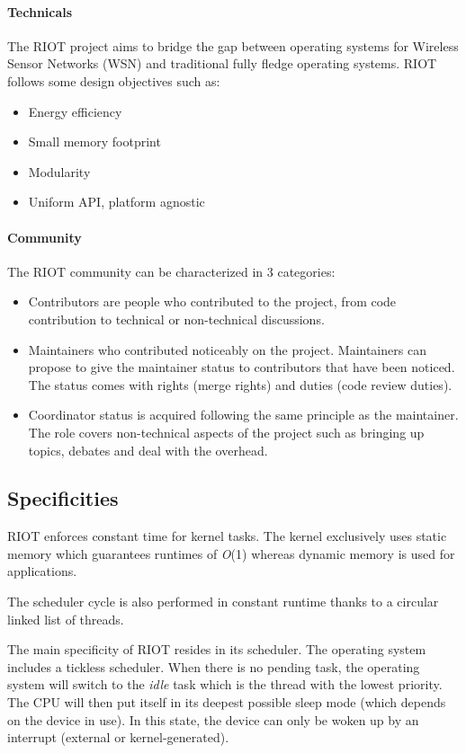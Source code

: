 \paragraph{Technicals} The RIOT project aims to bridge the gap between operating systems for Wireless Sensor Networks (WSN) and traditional fully fledge operating systems.
RIOT follows some design objectives such as:
\begin{itemize}
    \item Energy efficiency
    \item Small memory footprint
    \item Modularity
    \item Uniform API, platform agnostic
\end{itemize}

\paragraph{Community} The RIOT community can be characterized in 3 categories\cite{RIOTComm}:
\begin{itemize}
    \item Contributors are people who contributed to the project, from code contribution to technical or non-technical discussions.
    \item Maintainers who contributed noticeably on the project.
        Maintainers can propose to give the maintainer status to contributors that have been noticed.
        The status comes with rights (merge rights) and duties (code review duties).
    \item Coordinator status is acquired following the same principle as the maintainer.
        The role covers non-technical aspects of the project such as bringing up topics, debates and deal with the overhead.
\end{itemize}

\subsection{Specificities}
RIOT enforces constant time for kernel tasks.
The kernel exclusively uses static memory which guarantees runtimes of \textit{O}(1) whereas dynamic memory is used for applications.

The scheduler cycle is also performed in constant runtime thanks to a circular linked list of threads\cite{riotspec}.

The main specificity of RIOT resides in its scheduler.
The operating system includes a tickless scheduler.
When there is no pending task, the operating system will switch to the \textit{idle} task which is the thread with the lowest priority.
The CPU will then put itself in its deepest possible sleep mode (which depends on the device in use).
In this state, the device can only be woken up by an interrupt (external or kernel-generated).